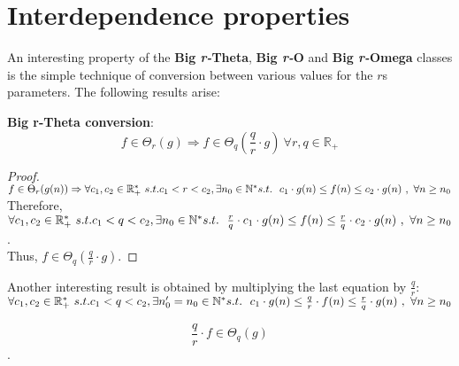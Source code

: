 \section{Interdependence properties}
An interesting property of the \textbf{Big \textit{r-}Theta},  \textbf{Big \textit{r-}O} and \textbf{Big \textit{r-}Omega} classes is the simple technique of conversion between various values for the $r$s parameters. The following results arise:

\begin{theorem}
    \textbf{Big r-Theta conversion}:
    \[  f \in \Theta_{r}(g) \Rightarrow f \in \Theta_{q} \left( \frac{q}{r} \cdot g \right) \ \forall r,q \in \mathbb{R}_{+}\]
\end{theorem}

\begin{proof}
    $ f \in \Theta_{r}(g(n)) \Rightarrow \forall c_{1}, c_{2} \in \mathbb{R}^{*}_{+} \ s.t. c_{1}< r < c_{2} , \exists n_{0} \in \mathbb{N}^{*}\ \\ s.t.\ \ c_{1} \cdot g(n) \leq f(n) \leq c_{2} \cdot g(n)\ ,\  \forall n \geq n_{0} $ \\
    Therefore, $\forall c_{1}, c_{2} \in \mathbb{R}^{*}_{+} \ s.t. c_{1} < q < c_{2} , \exists n_{0} \in \mathbb{N}^{*}\ \\ s.t.\ \ \frac{r}{q} \cdot c_{1} \cdot g(n) \leq f(n) \leq \frac{r}{q} \cdot c_{2} \cdot g(n)\ ,\  \forall n \geq n_{0}$. \\
    Thus, $f \in \Theta_{q} \left( \frac{q}{r} \cdot g \right)$.
\end{proof}

Another interesting result is obtained by multiplying the last equation by $\frac{q}{r}$: \\
$\forall c_{1}, c_{2} \in \mathbb{R}^{*}_{+} \ s.t. c_{1} < q < c_{2} , \exists n_{0}' = n_{0} \in \mathbb{N}^{*}\ \\ s.t.\ \ c_{1} \cdot g(n) \leq \frac{q}{r} \cdot f(n) \leq \frac{r}{q} \cdot g(n)\ ,\  \forall n \geq n_{0}$
\begin{corollary}
    \[ \frac{q}{r} \cdot f \in \Theta_{q} \left( g \right)\].
\end{corollary}




